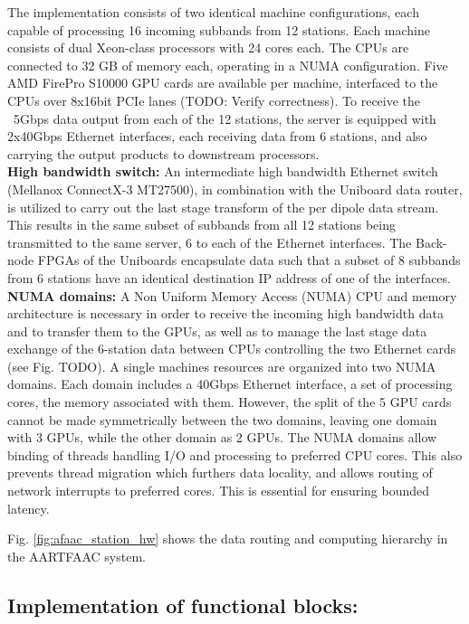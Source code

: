 \documentclass{ws-jai}
\begin{document}
The  implementation  consists  of  two identical  machine  configurations,  each
capable  of processing  16  incoming  subbands from  12  stations. Each  machine
consists  of  dual Xeon-class  processors  with  24  cores  each. The  CPUs  are
connected to 32 GB  of memory each, operating in a  NUMA configuration. Five AMD
FirePro S10000 GPU cards are available  per machine, interfaced to the CPUs over
8x16bit PCIe lanes (TODO: Verify correctness). To receive the ~5Gbps data output
from each  of the 12 stations,  the server is equipped  with 2x40Gbps Ethernet
interfaces, each  receiving data from 6  stations, and also carrying  the output
products to downstream processors.\\

\noindent  \textbf  {High  bandwidth  switch:} An  intermediate  high  bandwidth
Ethernet switch (Mellanox ConnectX-3 MT27500),  in combination with the Uniboard
data router, is utilized to carry out the last stage transform of the per dipole
data stream. This  results in the same  subset of subbands from  all 12 stations
being transmitted to the same server, 6 to each of the Ethernet interfaces.  The
Back-node  FPGAs of  the Uniboards  encapsulate  data such  that a  subset of  8
subbands from 6 stations have an identical  destination IP address of one of the
interfaces.\\

\noindent \textbf  {NUMA domains:} A  Non Uniform  Memory Access (NUMA)  CPU and
memory architecture is necessary in order to receive the incoming high bandwidth
data and to transfer them to the GPUs,  as well as to manage the last stage data
exchange of the  6-station data between CPUs controlling the  two Ethernet cards
(see  Fig. TODO).   A  single machines  resources are  organized  into two  NUMA
domains.  Each domain includes a 40Gbps  Ethernet interface, a set of processing
cores, the memory  associated with them. However,  the split of the  5 GPU cards
cannot be made symmetrically between the  two domains, leaving one domain with 3
GPUs, while  the other  domain as  2 GPUs.   The NUMA  domains allow  binding of
threads handling I/O and processing to  preferred CPU cores.  This also prevents
thread migration  which furthers  data locality, and  allows routing  of network
interrupts to preferred cores. This is essential for ensuring bounded latency.

Fig. \ref{fig:afaac_station_hw}  shows the data routing  and computing hierarchy
in the AARTFAAC system.

\subsection {Implementation of functional  blocks:} 
\end{document}
